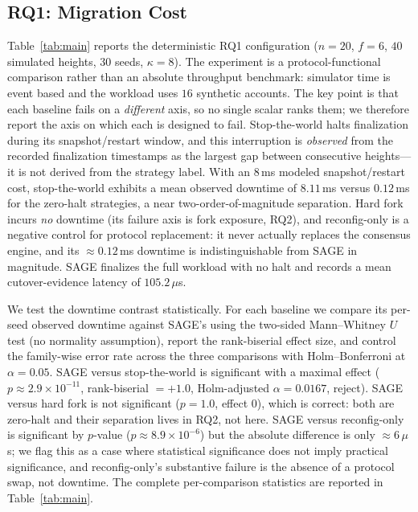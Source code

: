 \documentclass[journal]{IEEEtran}
\begin{document}
\subsection{RQ1: Migration Cost}
Table~\ref{tab:main} reports the deterministic RQ1
configuration ($n=20$, $f=6$, $40$ simulated heights, $30$ seeds, $\kappa=8$). The experiment is
a protocol-functional comparison rather than an absolute throughput benchmark: simulator time is
event based and the workload uses $16$ synthetic accounts. The key point is that each baseline
fails on a \emph{different} axis, so no single scalar ranks them; we therefore report the axis on
which each is designed to fail. Stop-the-world halts finalization during its snapshot/restart
window, and this interruption is \emph{observed} from the recorded finalization timestamps as the
largest gap between consecutive heights---it is not derived from the strategy label. With an
$8\,$ms modeled snapshot/restart cost, stop-the-world exhibits a mean observed downtime of
$8.11\,$ms versus $0.12\,$ms for the zero-halt strategies, a near two-order-of-magnitude
separation. Hard fork incurs \emph{no} downtime (its failure axis is fork exposure, RQ2), and
reconfig-only is a negative control for protocol replacement: it never actually replaces the
consensus engine, and its $\approx 0.12\,$ms downtime is indistinguishable from SAGE in
magnitude. SAGE
finalizes the full workload with no halt and records a mean cutover-evidence latency of
$105.2\,\mu$s.

We test the downtime contrast statistically. For each baseline we compare its per-seed observed
downtime against SAGE's using the two-sided Mann--Whitney $U$ test (no normality assumption),
report the rank-biserial effect size, and control the family-wise error rate across the three
comparisons with Holm--Bonferroni at $\alpha=0.05$. SAGE versus stop-the-world is significant
with a maximal effect ($p\approx 2.9\times10^{-11}$, rank-biserial $=+1.0$, Holm-adjusted
$\alpha=0.0167$, reject). SAGE versus hard fork is not significant ($p=1.0$, effect $0$), which
is correct: both are zero-halt and their separation lives in RQ2, not here. SAGE versus
reconfig-only is significant by $p$-value ($p\approx 8.9\times10^{-6}$) but the absolute
difference is only $\approx 6\,\mu$s; we flag this as a case where statistical significance does
not imply practical significance, and reconfig-only's substantive failure is the absence of a
protocol swap, not downtime. The complete per-comparison statistics are reported in
Table~\ref{tab:main}.
\end{document}
